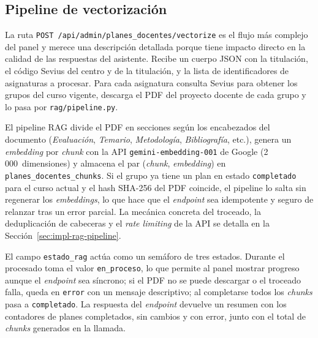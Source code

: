 \subsection{Pipeline de vectorización}

La ruta \texttt{POST /api/admin/planes\_docentes/vectorize} es el flujo más complejo del panel y merece una descripción detallada porque tiene impacto directo en la calidad de las respuestas del asistente. Recibe un cuerpo JSON con la titulación, el código Sevius del centro y de la titulación, y la lista de identificadores de asignaturas a procesar. Para cada asignatura consulta Sevius para obtener los grupos del curso vigente, descarga el PDF del proyecto docente de cada grupo y lo pasa por \texttt{rag/pipeline.py}.

El pipeline RAG divide el PDF en secciones según los encabezados del documento (\textit{Evaluación}, \textit{Temario}, \textit{Metodología}, \textit{Bibliografía}, etc.), genera un \textit{embedding} por \textit{chunk} con la API \texttt{gemini-embedding-001} de Google (2\,000~dimensiones) y almacena el par (\textit{chunk}, \textit{embedding}) en \texttt{planes\_docentes\_chunks}. Si el grupo ya tiene un plan en estado \texttt{completado} para el curso actual y el hash SHA-256 del PDF coincide, el pipeline lo salta sin regenerar los \textit{embeddings}, lo que hace que el \textit{endpoint} sea idempotente y seguro de relanzar tras un error parcial. La mecánica concreta del troceado, la deduplicación de cabeceras y el \textit{rate limiting} de la API se detalla en la Sección~\ref{sec:impl-rag-pipeline}.

El campo \texttt{estado\_rag} actúa como un semáforo de tres estados. Durante el procesado toma el valor \texttt{en\_proceso}, lo que permite al panel mostrar progreso aunque el \textit{endpoint} sea síncrono; si el PDF no se puede descargar o el troceado falla, queda en \texttt{error} con un mensaje descriptivo; al completarse todos los \textit{chunks} pasa a \texttt{completado}. La respuesta del \textit{endpoint} devuelve un resumen con los contadores de planes completados, sin cambios y con error, junto con el total de \textit{chunks} generados en la llamada.
